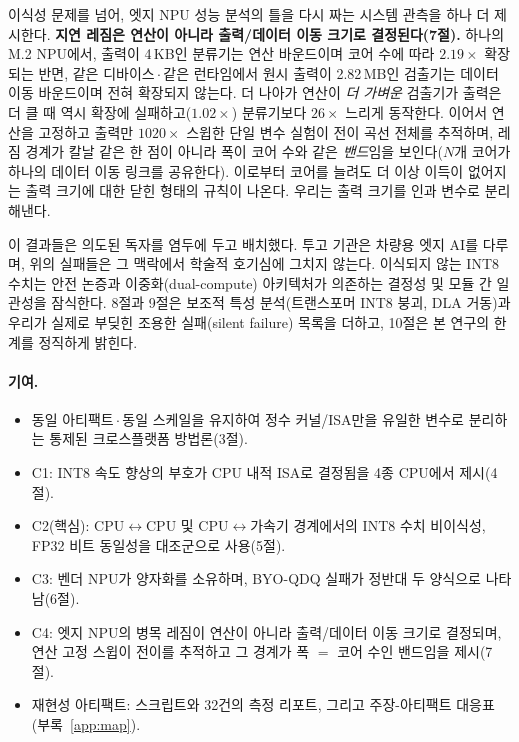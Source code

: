 \documentclass[11pt]{article}
\begin{document}
이식성 문제를 넘어, 엣지 NPU 성능 분석의 틀을 다시 짜는 시스템 관측을 하나 더 제시한다. \textbf{지연 레짐은 연산이 아니라 출력/데이터 이동 크기로 결정된다(7절).} 하나의 M.2 NPU에서, 출력이 4\,KB인 분류기는 연산 바운드이며 코어 수에 따라 $2.19\times$ 확장되는 반면, 같은 디바이스\,$\cdot$\,같은 런타임에서 원시 출력이 2.82\,MB인 검출기는 데이터 이동 바운드이며 전혀 확장되지 않는다. 더 나아가 연산이 \emph{더 가벼운} 검출기가 출력은 더 클 때 역시 확장에 실패하고($1.02\times$) 분류기보다 $26\times$ 느리게 동작한다. 이어서 연산을 고정하고 출력만 $1020\times$ 스윕한 단일 변수 실험이 전이 곡선 전체를 추적하며, 레짐 경계가 칼날 같은 한 점이 아니라 폭이 코어 수와 같은 \emph{밴드}임을 보인다($N$개 코어가 하나의 데이터 이동 링크를 공유한다). 이로부터 코어를 늘려도 더 이상 이득이 없어지는 출력 크기에 대한 닫힌 형태의 규칙이 나온다. 우리는 출력 크기를 인과 변수로 분리해낸다.

이 결과들은 의도된 독자를 염두에 두고 배치했다. 투고 기관은 차량용 엣지 AI를 다루며, 위의 실패들은 그 맥락에서 학술적 호기심에 그치지 않는다. 이식되지 않는 INT8 수치는 안전 논증과 이중화(dual-compute) 아키텍처가 의존하는 결정성 및 모듈 간 일관성을 잠식한다. 8절과 9절은 보조적 특성 분석(트랜스포머 INT8 붕괴, DLA 거동)과 우리가 실제로 부딪힌 조용한 실패(silent failure) 목록을 더하고, 10절은 본 연구의 한계를 정직하게 밝힌다.

\paragraph{기여.}
\begin{itemize}
\item 동일 아티팩트\,$\cdot$\,동일 스케일을 유지하여 정수 커널/ISA만을 유일한 변수로 분리하는 통제된 크로스플랫폼 방법론(3절).
\item C1: INT8 속도 향상의 부호가 CPU 내적 ISA로 결정됨을 4종 CPU에서 제시(4절).
\item C2(핵심): CPU$\leftrightarrow$CPU 및 CPU$\leftrightarrow$가속기 경계에서의 INT8 수치 비이식성, FP32 비트 동일성을 대조군으로 사용(5절).
\item C3: 벤더 NPU가 양자화를 소유하며, BYO-QDQ 실패가 정반대 두 양식으로 나타남(6절).
\item C4: 엣지 NPU의 병목 레짐이 연산이 아니라 출력/데이터 이동 크기로 결정되며, 연산 고정 스윕이 전이를 추적하고 그 경계가 폭 $=$ 코어 수인 밴드임을 제시(7절).
\item 재현성 아티팩트: 스크립트와 32건의 측정 리포트, 그리고 주장-아티팩트 대응표(부록~\ref{app:map}).
\end{itemize}
\end{document}
